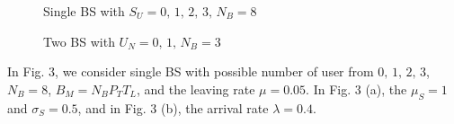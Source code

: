 \documentclass[conference]{IEEEtran}
\begin{document}
\begin{figure}[t]
\centering
{}
\caption{Single BS with \(S_U = 0,\,1,\,2,\,3,\, N_B = 8\)}
\end{figure}
\begin{figure}[t]
\centering
{}
\caption{Two BS with \(U_N = 0,\,1,\, N_B = 3\)}
\end{figure}
\indent In Fig. 3, we consider single BS with possible number of user from \(0,\, 1,\, 2,\, 3\), \(N_B = 8\), \(B_M = N_BP_TT_L\),
and the leaving rate \(\mu = 0.05\). 
In Fig. 3 (a), the \(\mu_S = 1\) and \(\sigma_S = 0.5\), and in Fig. 3 (b), the arrival rate \(\lambda = 0.4\). 
\end{document}
